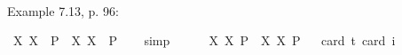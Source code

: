 \begin{isabellebody}
%
\ %
%
\isamarkupfalse%
\ \ \ %
%
%
%
\isanewline
{}\isamarkupfalse%
\ {\isachardoublequoteopen}{\isasymlfloor}{\isacharparenleft}{\isacharparenleft}{\isasymlambda}{\isasymalpha}{\isachardot}\ \isactrlbold {\isasymdiamond}{\isasymphi}\ {\isasymalpha}{\isacharparenright}\ {\isasymdownharpoonleft}{\isacharparenleft}{\isasymtau}{\isacharcolon}{\isacharcolon}{\isasymup}{\isasymzero}{\isacharparenright}{\isacharparenright}\ \isactrlbold {\isasymleftrightarrow}\ {\isacharparenleft}\isactrlbold {\isasymdiamond}{\isasymphi}\ {\isasymdownharpoonleft}{\isasymtau}{\isacharparenright}{\isasymrfloor}{\isachardoublequoteclose}\ \isamarkupfalse%
%
\ %
%
\isamarkupfalse%
\ \ \ %
%
%
%
%
\begin{isamarkuptext}%
Example 7.13, p. 96:%
\end{isamarkuptext}\isamarkuptrue%
\isamarkupfalse%
\ {\isachardoublequoteopen}{\isasymlfloor}{\isacharparenleft}{\isasymlambda}X{\isachardot}\ \isactrlbold {\isasymdiamond}\isactrlbold {\isasymexists}X{\isacharparenright}\ \ {\isacharparenleft}P{\isacharcolon}{\isacharcolon}{\isasymup}{\isasymlangle}{\isasymzero}{\isasymrangle}{\isacharparenright}\ \isactrlbold {\isasymrightarrow}\ \isactrlbold {\isasymdiamond}{\isacharparenleft}{\isacharparenleft}{\isasymlambda}X{\isachardot}\ \isactrlbold {\isasymexists}X{\isacharparenright}\ \ P{\isacharparenright}{\isasymrfloor}{\isachardoublequoteclose}%
\ \ %
%
\isamarkupfalse%
\ simp%
%
%
\ \ \ \ \isanewline
{}\isamarkupfalse%
\ {\isachardoublequoteopen}{\isasymlfloor}{\isacharparenleft}{\isasymlambda}X{\isachardot}\ \isactrlbold {\isasymdiamond}\isactrlbold {\isasymexists}X{\isacharparenright}\ \isactrlbold {\isasymdown}{\isacharparenleft}P{\isacharcolon}{\isacharcolon}{\isasymup}{\isasymlangle}{\isasymzero}{\isasymrangle}{\isacharparenright}\ \isactrlbold {\isasymrightarrow}\ \isactrlbold {\isasymdiamond}{\isacharparenleft}{\isacharparenleft}{\isasymlambda}X{\isachardot}\ \isactrlbold {\isasymexists}X{\isacharparenright}\ \isactrlbold {\isasymdown}P{\isacharparenright}{\isasymrfloor}{\isachardoublequoteclose}\isanewline
\ \ \isamarkupfalse%
{\isacharbrackleft}card\ {\isacharprime}t{\isacharequal}{}{\isacharcomma}\ card\ i{\isacharequal}{}{\isacharbrackright}%
\ %
%
\isamarkupfalse%
\ %
%
%
%
%
\begin{isamarkuptext}%

\end{isamarkuptext}
\end{isabellebody}
